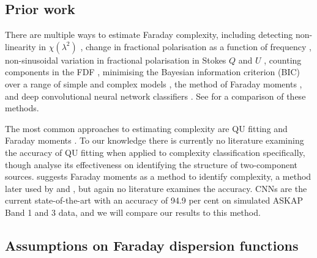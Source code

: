   \subsection{Prior work}
  \label{sec:faraday-prior-work}

      There are multiple ways to estimate Faraday complexity, including detecting non-\linebreak{}linearity in $\chi(\lambda^2)$ \citep{goldstein84faraday}, change in fractional polarisation as a function of frequency \citep{farnes14broadband}, non-sinusoidal variation in fractional polarisation in Stokes $Q$ and $U$ \citep{osullivan12agn}, counting components in the FDF \citep{law11faraday}, minimising the Bayesian information criterion (BIC) over a range of simple and complex models \citep[called ;][]{osullivan_broad-band_2017}, the method of Faraday moments \citep{anderson_broadband_2015,brown11report}, and deep convolutional neural network classifiers \citep[CNNs;][]{brown_classifying_2018}. See \citet{sun15comparison} for a comparison of these methods.

      The most common approaches to estimating complexity are QU fitting \linebreak\citep[e.g.][]{osullivan_broad-band_2017} and Faraday moments \citep[e.g.][]{anderson_broadband_2015}. To our knowledge there is currently no literature examining the accuracy of QU fitting when applied to complexity classification specifically, though \citet{miyashita19qu} analyse its effectiveness on identifying the structure of two-component sources. \citet{brown11report} suggests Faraday moments as a method to identify complexity, a method later used by \citet{farnes14broadband} and \citet{anderson_broadband_2015}, but again no literature examines the accuracy. CNNs are the current state-of-the-art with an accuracy of 94.9 per cent \citep{brown_classifying_2018} on simulated ASKAP Band 1 and 3 data, and we will compare our results to this method.

  \subsection{Assumptions on Faraday dispersion functions}
  \label{sec:faraday-fdfs}

